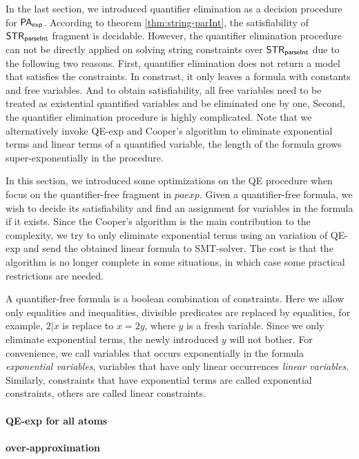 
In the last section, 
we introduced quantifier elimination as a decision procedure for {${\sf PA}_{\sf exp}$}. According to theorem \ref{thm:string-parInt}, the satisfiability of {${\sf STR}_{\textsf{parseInt}}$} fragment is decidable.
However, the quantifier elimination procedure can not be directly applied on solving string constraints over {${\sf STR}_{\textsf{parseInt}}$} due to the following two reasons.
First, quantifier elimination does not return a model that satisfies the constraints. In constrast, it only leaves a formula with constants and free variables. And to obtain satisfiability, all free variables need to be treated as existential quantified variables and be eliminated one by one, 
Second, the quantifier elimination procedure is highly complicated. Note that we alternatively invoke QE-exp and Cooper's algorithm to eliminate exponential terms and linear terms of a quantified variable, the length of the formula grows super-exponentially in the procedure. 

In this section, we introduced some optimizations on the QE procedure when focus on the quantifier-free fragment in {$paexp$}. Given a quantifier-free formula, we wish to decide its satisfiability and find an assignment for variables in the formula if it exists. Since the Cooper's algorithm is the main contribution to the complexity, we try to only eliminate exponential terms using an variation of QE-exp and send the obtained linear formula to SMT-solver. The cost is that the algorithm is no longer complete in some situations, in which case some practical restrictions are needed.

A quantifier-free formula is a boolean combination of constraints. Here we allow only equalities and inequalities, divisible predicates are replaced by equalities, for example, $2|x$ is replace to $x=2y$, where $y$ is a fresh variable. Since we only eliminate exponential terms, the newly introduced $y$ will not bother. For convenience, we call variables that occurs exponentially in the formula \emph{exponential variables}, variables that have only linear occurrences \emph{linear variables}. Similarly,
constraints that have exponential terms are called exponential constraints, others are called linear constraints.

\paragraph{QE-exp for all atoms} 

\paragraph{over-approximation}

